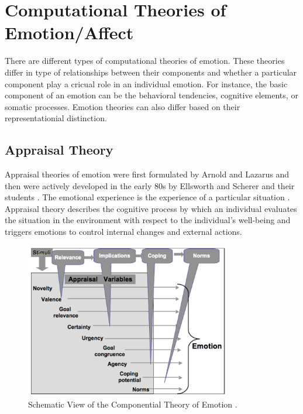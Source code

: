 \documentclass[11pt]{article}
\begin{document}
\section{Computational Theories of Emotion/Affect}

There are different types of computational theories of emotion. These theories
differ in type of relationships between their components and whether a
particular component play a cricual role in an individual emotion. For instance,
the basic component of an emotion can be the behavioral tendencies, cognitive
elements, or somatic processes. Emotion theories can also differ based on their
representationial distinction.

\subsection{Appraisal Theory}
\label{sec:appraisal-theory}

Appraisal theories of emotion were first formulated by Arnold
\cite{arnold:emotion-personality} and Lazarus \cite{lazarus:emotion-adaptation}
and then were actively developed in the early 80s by Ellsworth and Scherer and
their students \cite{roseman:appraisal-theory}
\cite{sander:systems-approach-appraisal} \cite{scherer:nature-function-emotion}
\cite{scherer:appraisal-processes} \cite{scherer:emotions-emergent}. The
emotional experience is the experience of a particular situation
\cite{frijda:emotions}. Appraisal theory describes the cognitive process by
which an individual evaluates the situation in the environment with respect to
the individual's well-being and triggers emotions to control internal changes
and external actions.

\begin{figure}[tbh]
  \center
  \includegraphics[width=0.8\textwidth]{figure/cpm.png}
  \caption{Schematic View of the Componential Theory of Emotion
  \cite{hudlicka:guidelines-emotions}.}
  \label{fig:cpm}
\end{figure}
\end{document}
